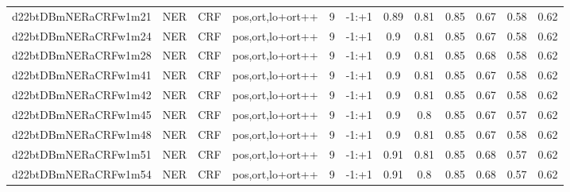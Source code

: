 \documentclass[a4paper]{article}
\begin{document}
\begin{landscape}
\begin{center}
\begin{tabular}{ |c|c|c|c|c|c|c|c|c|c|c|c|}
 	
 
 	
 		
 		\small{ d22btDBmNERaCRFw1m21 } & NER & CRF & pos,ort,lo+ort++  &  9 &  -1:+1  &  0.89 & 0.81 & 0.85  &  0.67 & 0.58 & 0.62 \\
 		

 	
 
 	
 		
 		\small{ d22btDBmNERaCRFw1m24 } & NER & CRF & pos,ort,lo+ort++  &  9 &  -1:+1  &  0.9 & 0.81 & 0.85  &  0.67 & 0.58 & 0.62 \\
 		

 	
 
 	
 		
 		\small{ d22btDBmNERaCRFw1m28 } & NER & CRF & pos,ort,lo+ort++  &  9 &  -1:+1  &  0.9 & 0.81 & 0.85  &  0.68 & 0.58 & 0.62 \\
 		

 	
 
 	
 		
 		\small{ d22btDBmNERaCRFw1m41 } & NER & CRF & pos,ort,lo+ort++  &  9 &  -1:+1  &  0.9 & 0.81 & 0.85  &  0.67 & 0.58 & 0.62 \\
 		

 	
 
 	
 		
 		\small{ d22btDBmNERaCRFw1m42 } & NER & CRF & pos,ort,lo+ort++  &  9 &  -1:+1  &  0.9 & 0.81 & 0.85  &  0.67 & 0.58 & 0.62 \\
 		

 	
 
 	
 		
 		\small{ d22btDBmNERaCRFw1m45 } & NER & CRF & pos,ort,lo+ort++  &  9 &  -1:+1  &  0.9 & 0.8 & 0.85  &  0.67 & 0.57 & 0.62 \\
 		

 	
 
 	
 		
 		\small{ d22btDBmNERaCRFw1m48 } & NER & CRF & pos,ort,lo+ort++  &  9 &  -1:+1  &  0.9 & 0.81 & 0.85  &  0.67 & 0.58 & 0.62 \\
 		

 	
 
 	
 		
 		\small{ d22btDBmNERaCRFw1m51 } & NER & CRF & pos,ort,lo+ort++  &  9 &  -1:+1  &  0.91 & 0.81 & 0.85  &  0.68 & 0.57 & 0.62 \\
 		

 	
 
 	
 		
 		\small{ d22btDBmNERaCRFw1m54 } & NER & CRF & pos,ort,lo+ort++  &  9 &  -1:+1  &  0.91 & 0.8 & 0.85  &  0.68 & 0.57 & 0.62 \\
 		


\end{tabular}
\end{center}
\end{landscape}
\end{document}
